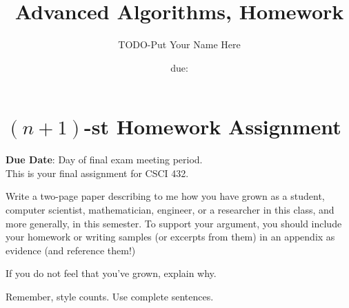 \documentclass{article}
\title{Advanced Algorithms, Homework \hwnum}
\author{TODO-Put Your Name Here}
\date{due: \todo{}}
\begin{document}
\section*{$(n+1)$-st Homework Assignment}

{\bf{Due Date}}: Day of final exam meeting period.\\

This is your final assignment for CSCI 432.

Write a two-page paper describing to me how you have grown as a student,
computer scientist, mathematician, engineer, or a researcher in this class, and
more generally, in this semester.  To support your argument, you should include
your homework or writing samples (or excerpts from them) in an appendix as
evidence (and reference them!)

If you do not feel that you've grown, explain why.

Remember, style counts. Use complete sentences.
\end{document}
